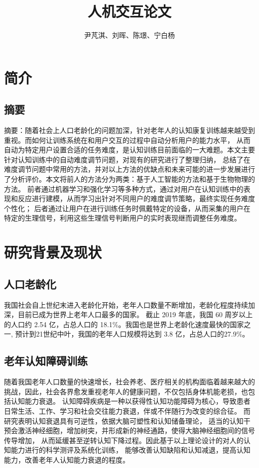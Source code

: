 \documentclass[12pt]{article}
\author{尹芃淇、刘晖、陈璟、宁白杨}
\title{人机交互论文}
\begin{document}
    \maketitle
    \section{简介}
    \subsection{摘要}
    摘要：随着社会上人口老龄化的问题加深，针对老年人的认知康复训练越来越受到重视。而如何让训练系统在和用户交互的过程中自动分析用户的能力水平，
    从而自动为特定用户设置合适的任务难度，是认知训练目前面临的一大难题。本文主要针对认知训练中的自动难度调节问题，对现有的研究进行了整理归纳，
    总结了在难度调节问题中常用的方法，并对以上方法的优缺点和未来可能的进一步发展进行了分析评价。本文将前人的方法分为两类：基于人工智能的方法和基于生物物理的方法。
    前者通过机器学习和强化学习等多种方式，通过对用户在认知训练中的表现和反应进行建模，从而学习出针对不同用户的难度调节策略，最终实现任务难度个性化；
    后者通过让用户在进行训练任务时佩戴特定的设备，从而采集的用户在特定的生理信号，利用这些生理信号判断用户的实时表现继而调整任务难度。
    \section{研究背景及现状}
        \subsection{人口老龄化}
        我国社会自上世纪末进入老龄化开始，老年人口数量不断增加，老龄化程度持续加深，目前已成为世界上老年人口最多的国家。
        截止 2019 年底，我国 60 周岁以上的人口约 2.54 亿，占总人口的 18.1\%。我国也是世界上老龄化速度最快的国家之一,
        预计到21世纪中叶，我国的老年人口规模将达到 3.8 亿，占总人口的27.9\%。
        
        \subsection{老年认知障碍训练}

        随着我国老年人口数量的快速增长，社会养老、医疗相关的机构面临着越来越大的挑战，因此，社会各界愈发重视老年人的健康问题，不仅包括身体机能老损，也包括认知能力衰退。
        认知障碍疾病是一种以获得性认知功能障碍为核心，导致患者日常生活、工作、学习和社会交往能力衰退，伴或不伴随行为改变的综合征。
        而研究表明认知衰退具有可逆性，依据大脑可塑性和认知储备理论\cite{ref1}，
        适当的认知干预会激活神经细胞，增加树突，并形成新的神经通路，使得大脑神经细胞间的信号传导增加\cite{ref2}，
        从而延缓甚至逆转认知下降过程。因此基于以上理论设计的对人的认知能力进行的科学测评及系统化训练，
        能够改善认知缺陷和认知减退，提高认知能力\cite{ref3, ref4}，改善老年人认知能力衰退的程度。
\end{document}
